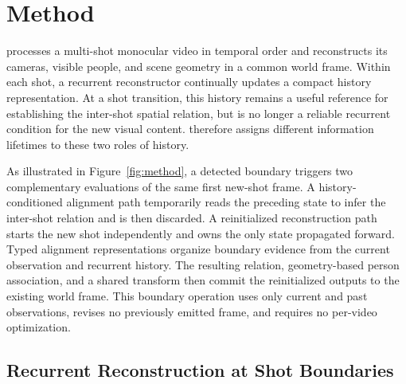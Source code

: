 \section{Method}
\label{sec:method}

\method{} processes a multi-shot monocular video in temporal order and
reconstructs its cameras, visible people, and scene geometry in a common world
frame. Within each shot, a recurrent reconstructor continually updates a
compact history representation. At a shot transition, this history remains a
useful reference for establishing the inter-shot spatial relation, but is no
longer a reliable recurrent condition for the new visual content. \method{}
therefore assigns different information lifetimes to these two roles of
history.

As illustrated in Figure~\ref{fig:method}, a detected boundary triggers two
complementary evaluations of the same first new-shot frame. A
history-conditioned alignment path temporarily reads the preceding state to
infer the inter-shot relation and is then discarded. A reinitialized
reconstruction path starts the new shot independently and owns the only state
propagated forward. Typed alignment representations organize boundary evidence
from the current observation and recurrent history. The resulting relation,
geometry-based person association, and a shared transform then commit the
reinitialized outputs to the existing world frame. This boundary operation
uses only current and past observations, revises no previously emitted frame,
and requires no per-video optimization.



\subsection{Recurrent Reconstruction at Shot Boundaries}

